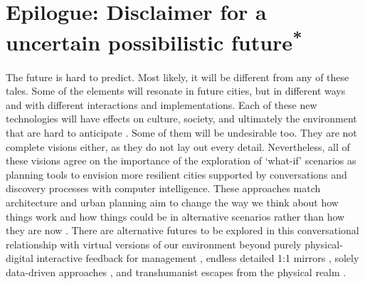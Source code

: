 \section*{Epilogue: Disclaimer for a uncertain possibilistic future\textsuperscript{*}}


The future is hard to predict. Most likely, it will be different from any of these tales. Some of the elements will resonate in future cities, but in different ways and with different interactions and implementations. Each of these new technologies will have effects on culture, society, and ultimately the environment that are hard to anticipate \citep{Berkhout2004, Gao2014}. Some of them will be undesirable too. They are not complete visions either, as they do not lay out every detail. Nevertheless, all of these visions agree on the importance of the exploration of `what-if’ scenarios as planning tools to envision more resilient cities supported by conversations and discovery processes with computer intelligence. These approaches match architecture and urban planning aim to change the way we think about how things work and how things could be in alternative scenarios rather than how they are now  \citep{Doucet2009, Simon1969}. There are alternative futures to be explored in this conversational relationship with virtual versions of our environment \citep{Pask1976} beyond purely physical-digital interactive feedback for management \citep{Fuller2020}, endless detailed 1:1 mirrors \citep{Borges1946}, solely data-driven approaches \citep{Caldarelli2023, VanDijck2014}, and transhumanist escapes from the physical realm \citep{Kye2021}. 

